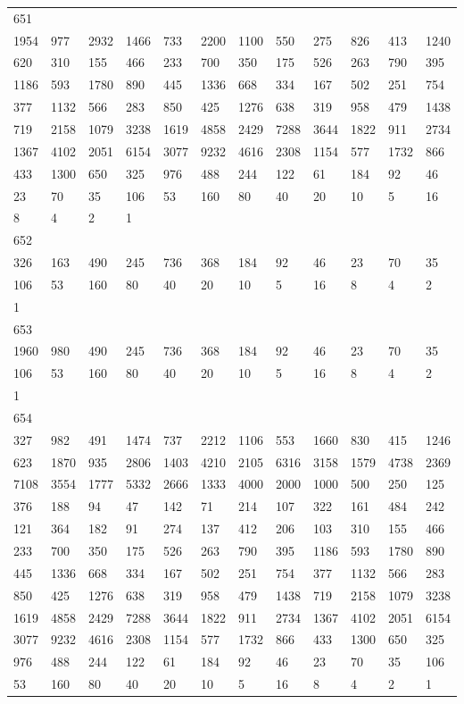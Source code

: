 \begin{longtable}{llllllllllll}
651&&&&&&&&&&&\\
1954& 977& 2932& 1466& 733& 2200& 1100& 550& 275& 826& 413& 1240\\
620& 310& 155& 466& 233& 700& 350& 175& 526& 263& 790& 395\\
1186& 593& 1780& 890& 445& 1336& 668& 334& 167& 502& 251& 754\\
377& 1132& 566& 283& 850& 425& 1276& 638& 319& 958& 479& 1438\\
719& 2158& 1079& 3238& 1619& 4858& 2429& 7288& 3644& 1822& 911& 2734\\
1367& 4102& 2051& 6154& 3077& 9232& 4616& 2308& 1154& 577& 1732& 866\\
433& 1300& 650& 325& 976& 488& 244& 122& 61& 184& 92& 46\\
23& 70& 35& 106& 53& 160& 80& 40& 20& 10& 5& 16\\
8& 4& 2& 1& \\

652&&&&&&&&&&&\\
326& 163& 490& 245& 736& 368& 184& 92& 46& 23& 70& 35\\
106& 53& 160& 80& 40& 20& 10& 5& 16& 8& 4& 2\\
1& \\

653&&&&&&&&&&&\\
1960& 980& 490& 245& 736& 368& 184& 92& 46& 23& 70& 35\\
106& 53& 160& 80& 40& 20& 10& 5& 16& 8& 4& 2\\
1& \\

654&&&&&&&&&&&\\
327& 982& 491& 1474& 737& 2212& 1106& 553& 1660& 830& 415& 1246\\
623& 1870& 935& 2806& 1403& 4210& 2105& 6316& 3158& 1579& 4738& 2369\\
7108& 3554& 1777& 5332& 2666& 1333& 4000& 2000& 1000& 500& 250& 125\\
376& 188& 94& 47& 142& 71& 214& 107& 322& 161& 484& 242\\
121& 364& 182& 91& 274& 137& 412& 206& 103& 310& 155& 466\\
233& 700& 350& 175& 526& 263& 790& 395& 1186& 593& 1780& 890\\
445& 1336& 668& 334& 167& 502& 251& 754& 377& 1132& 566& 283\\
850& 425& 1276& 638& 319& 958& 479& 1438& 719& 2158& 1079& 3238\\
1619& 4858& 2429& 7288& 3644& 1822& 911& 2734& 1367& 4102& 2051& 6154\\
3077& 9232& 4616& 2308& 1154& 577& 1732& 866& 433& 1300& 650& 325\\
976& 488& 244& 122& 61& 184& 92& 46& 23& 70& 35& 106\\
53& 160& 80& 40& 20& 10& 5& 16& 8& 4& 2& 1\\


\end{longtable}
